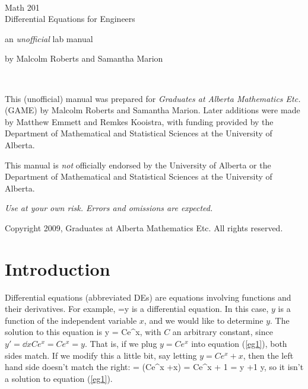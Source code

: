 \documentclass[12pt]{book}
\begin{document}

\pagestyle{empty}

\begin{center}
  \ \vspace{1in}

  \textsf{\LARGE Math 201} \\
  \vspace{0.2in}
  \textsf{\LARGE Differential Equations for Engineers}
  \vspace{2in}

  \textsf{\Huge an \emph{unofficial} lab manual}
  \vspace{2.5in}

by Malcolm Roberts and Samantha Marion
\vspace{0.5in}

\end{center}

\newpage

\ \vspace{5in}

\noindent
This (unofficial) manual was prepared for \emph{Graduates at Alberta
  Mathematics Etc.} (GAME) by Malcolm Roberts and Samantha Marion.
Later additions were made by Matthew Emmett and Remkes Kooistra, with
funding provided by the Department of Mathematical and Statistical
Sciences at the University of Alberta.
\vspace{0.5in}

\noindent
This manual is \emph{not} officially endorsed by the University of
Alberta or the Department of Mathematical and Statistical Sciences at
the University of Alberta.
\vspace{0.5in}

\noindent
\emph{Use at your own risk.  Errors and omissions are expected.}
\vspace{0.5in}

\noindent
Copyright 2009, Graduates at Alberta Mathematics Etc.  All rights
reserved.


\newpage
\pagestyle{plain}

\section*{Introduction}

Differential equations (abbreviated DEs) are equations involving functions and
their derivatives. For example,
\be \label{eg1}
 =y
\ee
is a differential equation. In this case, $y$ is a function of the independent
variable $x$, and we would like to determine $y$. The solution to this
equation is
\bee
y = Ce^x,
\eee
with $C$ an arbitrary constant, since $y'=\dd{}{x}Ce^x=Ce^x=y$. That is, if we
plug $y=Ce^x$ into equation (\ref{eg1}), both sides match. If we modify this
a little bit, say letting $y=Ce^x +x$, then the left hand side doesn't
match the right:
\bee
{} = (Ce^x +x) = Ce^x + 1 = y +1 \neq y,
\eee
so it isn't a solution to equation (\ref{eg1}).
\end{document}
